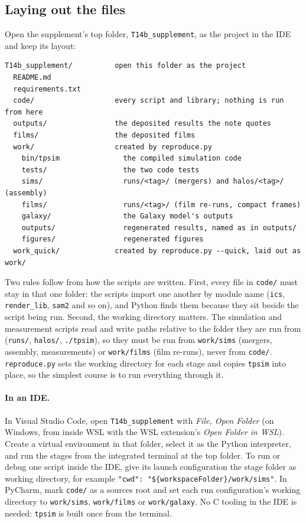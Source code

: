 \documentclass[11pt]{article}
\theoremstyle{definition}
\newcommand{\file}[1]{\texttt{#1}}
\begin{document}
\subsection{Laying out the files}

Open the supplement's top folder, \file{T14b\_supplement}, as the project in the IDE and keep its layout:
{\small\begin{verbatim}
T14b_supplement/          open this folder as the project
  README.md
  requirements.txt
  code/                   every script and library; nothing is run from here
  outputs/                the deposited results the note quotes
  films/                  the deposited films
  work/                   created by reproduce.py
    bin/tpsim               the compiled simulation code
    tests/                  the two code tests
    sims/                   runs/<tag>/ (mergers) and halos/<tag>/ (assembly)
    films/                  runs/<tag>/ (film re-runs, compact frames)
    galaxy/                 the Galaxy model's outputs
    outputs/                regenerated results, named as in outputs/
    figures/                regenerated figures
  work_quick/             created by reproduce.py --quick, laid out as work/
\end{verbatim}}
Two rules follow from how the scripts are written. First, every file in \file{code/} must stay in that one folder: the scripts import one another by module name (\file{ics}, \file{render\_lib}, \file{sam2} and so on), and Python finds them because they sit beside the script being run. Second, the working directory matters. The simulation and measurement scripts read and write paths relative to the folder they are run from (\file{runs/}, \file{halos/}, \file{./tpsim}), so they must be run from \file{work/sims} (mergers, assembly, measurements) or \file{work/films} (film re-runs), never from \file{code/}. \file{reproduce.py} sets the working directory for each stage and copies \file{tpsim} into place, so the simplest course is to run everything through it.

\paragraph{In an IDE.} In Visual Studio Code, open \file{T14b\_supplement} with \emph{File, Open Folder} (on Windows, from inside WSL with the WSL extension's \emph{Open Folder in WSL}). Create a virtual environment in that folder, select it as the Python interpreter, and run the stages from the integrated terminal at the top folder. To run or debug one script inside the IDE, give its launch configuration the stage folder as working directory, for example \verb|"cwd": "${workspaceFolder}/work/sims"|. In PyCharm, mark \file{code/} as a sources root and set each run configuration's working directory to \file{work/sims}, \file{work/films} or \file{work/galaxy}. No C tooling in the IDE is needed: \file{tpsim} is built once from the terminal.
\end{document}
